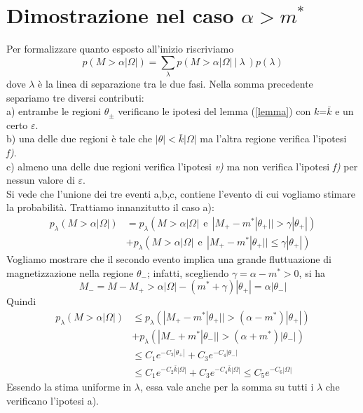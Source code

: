 \documentclass[aps,pre]{revtex4}
\newcommand{\beq}{\begin{equation}}
\newcommand{\eeq}{\end{equation}}
\begin{document}
\section{Dimostrazione nel caso $\alpha > m^*$}

\noindent
Per formalizzare quanto esposto all'inizio riscriviamo
\beq
p(M > \alpha |\Omega| ) = \sum_{\lambda} p(M > \alpha |\Omega| \ | \ \lambda \ ) p(\lambda)
\eeq
dove $\lambda$ \`e la linea di separazione tra le due fasi.
Nella somma precedente separiamo tre diversi contributi: \\
a) entrambe le regioni $\theta_{\pm}$ verificano le ipotesi del lemma (\ref{lemma}) con $k$=$\bar{k}$ e un certo $\varepsilon$. \\
b) una delle due regioni \`e tale che $|\theta| < \bar k |\Omega|$ ma l'altra regione verifica l'ipotesi {\it f)}. \\
c) almeno una delle due regioni verifica l'ipotesi {\it v)} ma non verifica l'ipotesi {\it f)} per nessun valore di $\varepsilon$. \\
Si vede che l'unione dei tre eventi a,b,c, contiene l'evento di cui vogliamo stimare la probabilit\`a. Trattiamo innanzitutto il caso a):
\beq
\label{divisione}
\begin{split}
p_\lambda(M > \alpha |\Omega| ) &= p_\lambda(M > \alpha |\Omega| \ \ \text{e} \ \  |M_+ - m^* |\theta_+|| > \gamma |\theta_+|) \\
&+  p_\lambda(M > \alpha |\Omega| \ \ \text{e} \ \ |M_+ - m^* |\theta_+|| \leq \gamma |\theta_+|)
\end{split}
\eeq
Vogliamo mostrare che il secondo evento implica una grande fluttuazione di magnetizzazione nella regione $\theta_-$; infatti, scegliendo $\gamma=\alpha - m^* > 0$, si ha
\beq
M_-=M-M_+ > \alpha |\Omega| - (m^* + \gamma) |\theta_+| = \alpha |\theta_-|
\eeq
Quindi
\beq
\label{stima1}
\begin{split}
p_\lambda(M > \alpha |\Omega| ) &\leq p_\lambda( |M_+ - m^* |\theta_+|| > (\alpha - m^*) |\theta_+|) \\
&+  p_\lambda( |M_- + m^* |\theta_-|| > (\alpha + m^*) |\theta_-|) \\
&\leq C_1 e^{-C_2 |\theta_+|} + C_3 e^{-C_4 |\theta_-|} \\
&\leq C_1 e^{-C_2 \bar{k} |\Omega|} + C_3 e^{-C_4 \bar{k} |\Omega|} \leq C_5 e^{-C_6 |\Omega|}
\end{split}
\eeq
Essendo la stima uniforme in $\lambda$, essa vale anche per la somma su tutti i $\lambda$ che verificano l'ipotesi a). \\
\end{document}

